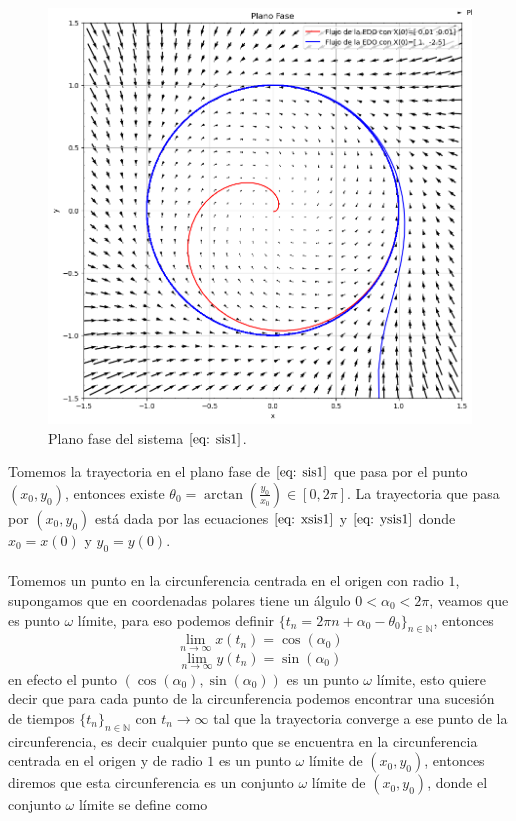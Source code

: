 \documentclass[12pt, a4paper]{report}
\begin{document}
\begin{figure}[h]
	\centering
	\includegraphics[width=13cm]{planofase1.png}
	\caption{Plano fase del sistema $\eqref{eq: sis1}$.}
\end{figure}

Tomemos la trayectoria en el plano fase de $\eqref{eq: sis1}$ que pasa por el punto
$(x_0,y_0)$, entonces existe $\theta_0=\arctan(\frac{y_0}{x_0})\in[0,2\pi]$.
La trayectoria que pasa por $(x_0,y_0)$ está dada por las ecuaciones $\eqref{eq: xsis1}$ y
$\eqref{eq: ysis1}$ donde $x_0=x(0)$ y $y_0=y(0)$.\\
\\Tomemos un punto en la circunferencia centrada en el origen con radio $1$,
supongamos que
en coordenadas polares tiene un álgulo $0<\alpha_0<2\pi$, veamos que es punto $\omega$ límite, para eso podemos definir
$\{t_n=2\pi n+\alpha_0-\theta_0\}_{n\in \mathbb{N}}$, entonces
$$\lim_{n\to\infty}x(t_n)=\cos(\alpha_0)$$
$$\lim_{n\to\infty}y(t_n)=\sin(\alpha_0)$$
en efecto el punto $(\cos(\alpha_0),\sin(\alpha_0))$ es un punto $\omega$ límite, esto
quiere decir que para cada punto de la circunferencia podemos encontrar
una sucesión de tiempos $\{t_n\}_{n\in \mathbb{N}}$ con $t_n\to\infty$ tal que la
trayectoria converge a ese punto de la circunferencia, es decir cualquier punto que se encuentra en la
circunferencia centrada en el origen y de radio $1$ es un punto $\omega$ límite de $(x_0,y_0)$,
entonces diremos que esta circunferencia es un conjunto $\omega$ límite de $(x_0,y_0)$, donde
el conjunto $\omega$ límite se define como
\end{document}

